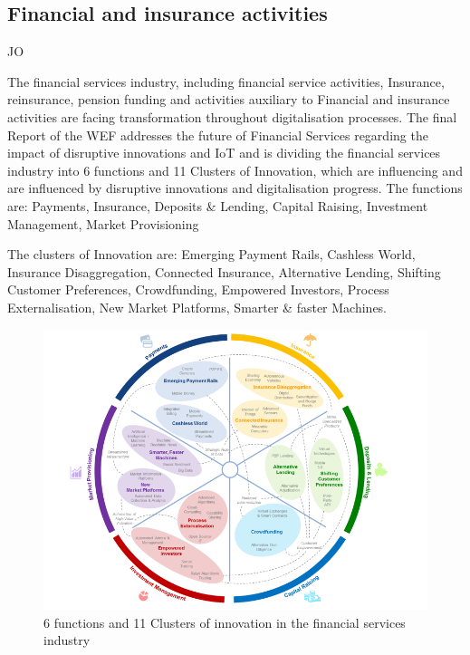 \subsection{Financial and insurance activities}
JO

The financial services industry, including financial service activities, Insurance, reinsurance, pension funding and activities auxiliary to Financial and insurance activities \citeauthor{ISIC:2008} are facing transformation throughout digitalisation processes. The final Report of the \ac{WEF} addresses the future of Financial Services regarding the impact of disruptive innovations and \ac{IoT} \citeauthor{WEF-futureFinancialServices} and is dividing the financial services industry into 6 functions and 11 Clusters of Innovation, which are influencing and are influenced by disruptive innovations and digitalisation progress.
The functions are:
Payments, Insurance, Deposits \& Lending, Capital Raising, Investment Management, Market Provisioning

The clusters of Innovation are:
Emerging Payment Rails, Cashless World, Insurance Disaggregation, Connected Insurance, Alternative Lending, Shifting Customer Preferences, Crowdfunding, Empowered Investors, Process Externalisation, New Market Platforms, Smarter \& faster Machines.

\begin{figure}[H]
\centering
\includegraphics[width=1\columnwidth]{images/industry-financial-services-6segments_wef-copyright.PNG}
\caption{6 functions and 11 Clusters of innovation in the financial services industry}
\end{figure}

